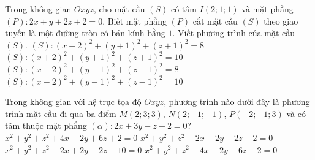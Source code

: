 \begin{ex}%
	Trong không gian $Oxyz$, cho mặt cầu $\left( S \right)$ có tâm $I\left( 2;1;1 \right)$ và mặt phẳng $\left( P \right)\colon2x+y+2z+2=0$. Biết mặt phẳng $\left( P \right)$ cắt mặt cầu $\left( S \right)$ theo giao tuyến là một đường tròn có bán kính bằng $1$. Viết phương trình của mặt cầu $\left( S \right)$.
	\choice
	{$\left( S \right)\colon\left( x+2 \right)^2+\left( y+1 \right)^2+\left( z+1 \right)^2=8$}
	{$\left( S \right)\colon\left( x+2 \right)^2+\left( y+1 \right)^2+\left( z+1 \right)^2=10$}
	{$\left( S \right)\colon\left( x-2 \right)^2+\left( y-1 \right)^2+\left( z-1 \right)^2=8$}
	{\True $\left( S \right)\colon\left( x-2 \right)^2+\left( y-1 \right)^2+\left( z-1 \right)^2=10$}
\end{ex}

\begin{ex}%
	Trong không gian với hệ trục tọa độ $Oxyz$, phương trình nào dưới đây là phương trình mặt cầu đi qua ba điểm $M\left( 2;3;3 \right)$, $N\left( 2;-1;-1 \right)$, $P\left( -2;-1;3 \right)$ và có tâm thuộc mặt phẳng $\left( \alpha \right)\colon2x+3y-z+2=0$?
	\choice
	{$x^2+y^2+z^2+4x-2y+6z+2=0$}
	{$x^2+y^2+z^2-2x+2y-2z-2=0$}
	{$x^2+y^2+z^2-2x+2y-2z-10=0$}
	{\True $x^2+y^2+z^2-4x+2y-6z-2=0$}
\end{ex}

